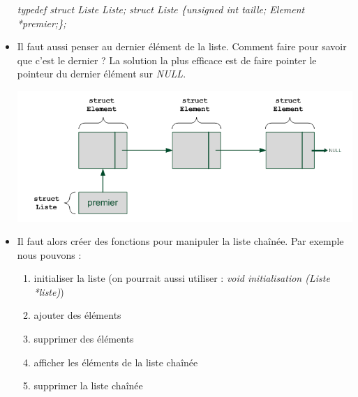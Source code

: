 \documentclass[12pt,a4paper]{article}
\begin{document}
\begin{itemize}
\newline \textit{typedef struct Liste Liste;}
\newline \textit{struct Liste \{unsigned int taille; Element *premier;\};}
\item Il faut aussi penser au dernier élément de la liste. Comment faire pour savoir que c'est le dernier ? La solution la plus efficace est de faire pointer le pointeur du dernier élément sur \textit{NULL}.
\begin{center}
\includegraphics[scale=2]{schema_liste_chainee}
\end{center}
\item Il faut alors créer des fonctions pour manipuler la liste chaînée. Par exemple nous pouvons :
\begin{enumerate}
\item initialiser la liste (on pourrait aussi utiliser : \textit{void initialisation (Liste *liste)})
\item ajouter des éléments
\item supprimer des éléments
\item afficher les éléments de la liste chaînée
\item supprimer la liste chaînée
\newline
 \begin{minipage}{\linewidth}
  \begin{figure}[H]
  \centering
    \hspace{1cm}

\end{figure}
\end{minipage}
\end{enumerate}
\end{itemize}
\end{document}
